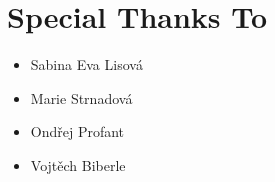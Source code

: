 
\chapter*{Special Thanks To}

\begin{itemize}
  \item[] Sabina Eva Lisová
  \item[] Marie Strnadová
  \item[] Ondřej Profant
  \item[] Vojtěch Biberle
\end{itemize}

